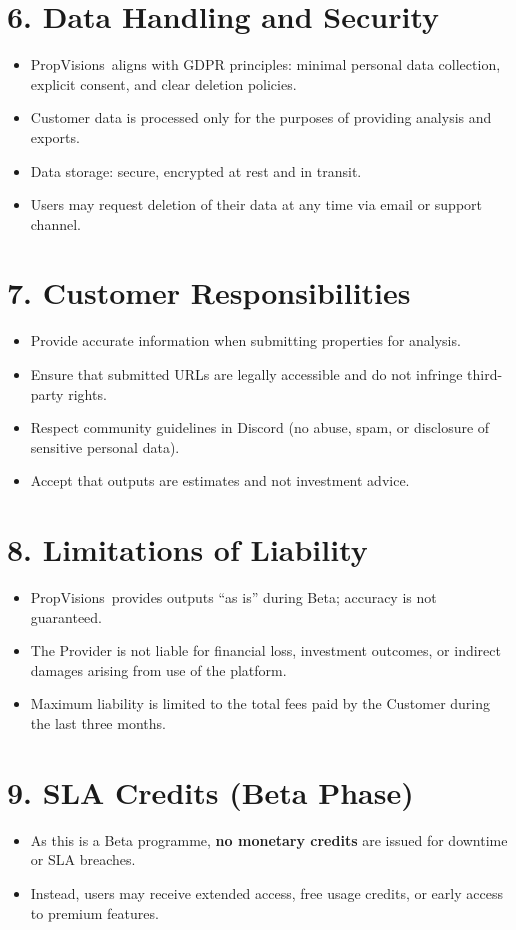 \documentclass[11pt,a4paper]{article}
\newcommand{\product}{PropVisions}
\begin{document}
\section*{6. Data Handling and Security}
\begin{itemize}[left=0pt]
  \item \product\ aligns with GDPR principles: minimal personal data collection, explicit consent, and clear deletion policies.
  \item Customer data is processed only for the purposes of providing analysis and exports.
  \item Data storage: secure, encrypted at rest and in transit.
  \item Users may request deletion of their data at any time via email or support channel.
\end{itemize}

\section*{7. Customer Responsibilities}
\begin{itemize}[left=0pt]
  \item Provide accurate information when submitting properties for analysis.
  \item Ensure that submitted URLs are legally accessible and do not infringe third-party rights.
  \item Respect community guidelines in Discord (no abuse, spam, or disclosure of sensitive personal data).
  \item Accept that outputs are estimates and not investment advice.
\end{itemize}

\section*{8. Limitations of Liability}
\begin{itemize}[left=0pt]
  \item \product\ provides outputs ``as is'' during Beta; accuracy is not guaranteed.
  \item The Provider is not liable for financial loss, investment outcomes, or indirect damages arising from use of the platform.
  \item Maximum liability is limited to the total fees paid by the Customer during the last three months.
\end{itemize}

\section*{9. SLA Credits (Beta Phase)}
\begin{itemize}[left=0pt]
  \item As this is a Beta programme, \textbf{no monetary credits} are issued for downtime or SLA breaches.
  \item Instead, users may receive extended access, free usage credits, or early access to premium features.
\end{itemize}
\end{document}
